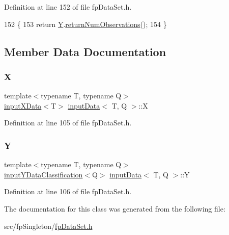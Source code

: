 Definition at line 152 of file fp\+Data\+Set.\+h.


\begin{DoxyCode}
152                                           \{
153             \textcolor{keywordflow}{return} \hyperlink{classinputData_a03b936fe0070cee08153cb4853003ab4}{Y}.\hyperlink{classinputYData_a93becb50dcb3b2d6dd3c488ae83b2c6b}{returnNumObservations}();
154         \}
\end{DoxyCode}


\subsection{Member Data Documentation}
\mbox{\label{classinputData_a31bffca53fea1a24c237e543cc5489a0}} 
\subsubsection{\texorpdfstring{X}{X}}
{\footnotesize\ttfamily template$<$typename T, typename Q$>$ \\
\hyperlink{classinputXData}{input\+X\+Data}$<$T$>$ \hyperlink{classinputData}{input\+Data}$<$ T, Q $>$\+::X\hspace{0.3cm}{\ttfamily [private]}}



Definition at line 105 of file fp\+Data\+Set.\+h.

\mbox{\label{classinputData_a03b936fe0070cee08153cb4853003ab4}} 
\subsubsection{\texorpdfstring{Y}{Y}}
{\footnotesize\ttfamily template$<$typename T, typename Q$>$ \\
\hyperlink{classinputYDataClassification}{input\+Y\+Data\+Classification}$<$Q$>$ \hyperlink{classinputData}{input\+Data}$<$ T, Q $>$\+::Y\hspace{0.3cm}{\ttfamily [private]}}



Definition at line 106 of file fp\+Data\+Set.\+h.



The documentation for this class was generated from the following file\+:\begin{DoxyCompactItemize}
\item 
src/fp\+Singleton/\hyperlink{fpDataSet_8h}{fp\+Data\+Set.\+h}\end{DoxyCompactItemize}
